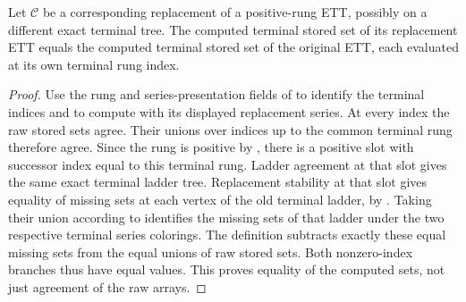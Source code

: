 \begin{lemma}
Let $\mathcal C$ be a corresponding replacement of a positive-rung ETT,
possibly on a different exact terminal tree. The computed terminal stored
set of its replacement ETT equals the computed terminal stored set of
the original ETT, each evaluated at its own terminal rung index.
\end{lemma}
\begin{proof}
Use the rung and series-presentation fields of
 to identify the terminal
indices and to compute with its displayed replacement series. At every
index the raw stored sets agree. Their unions over indices up to the
common terminal rung therefore agree. Since the rung is positive by
, there is a positive slot with successor
index equal to this terminal rung. Ladder agreement at that slot gives
the same exact terminal ladder tree. Replacement stability at that slot
gives equality of missing sets at each vertex of the old terminal ladder,
by . Taking their union according to
 identifies the missing sets of that ladder
under the two respective terminal series colorings. The definition
 subtracts exactly these equal missing sets
from the equal unions of raw stored sets. Both nonzero-index branches
thus have equal values. This proves equality of the computed sets, not
just agreement of the raw arrays.
\end{proof}
